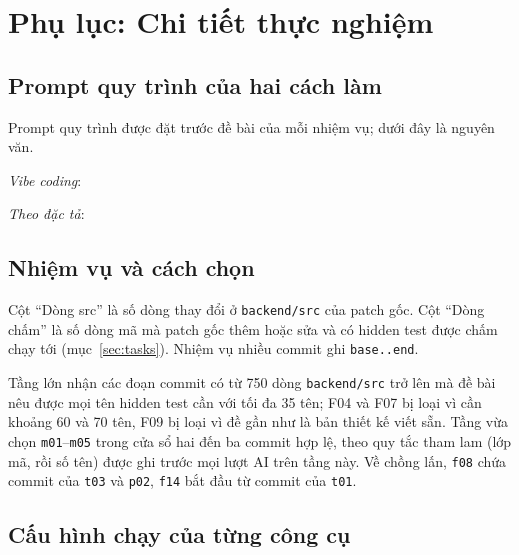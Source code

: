 \section*{Phụ lục: Chi tiết thực nghiệm}\label{app:details}

\subsection{Prompt quy trình của hai cách làm}\label{app:prompts}

Prompt quy trình được đặt trước đề bài của mỗi nhiệm vụ; dưới đây là nguyên văn.

\textit{Vibe coding}:
{\footnotesize{}}

\textit{Theo đặc tả}:
{\footnotesize{}}

\subsection{Nhiệm vụ và cách chọn}\label{app:tasks}

Cột ``Dòng src'' là số dòng thay đổi ở \texttt{backend/src} của patch gốc. Cột ``Dòng chấm'' là số dòng mã
mà patch gốc thêm hoặc sửa và có hidden test được chấm chạy tới (mục~\ref{sec:tasks}). Nhiệm vụ nhiều commit
ghi \texttt{base..end}.

\begin{table}[H]
\centering\small
\caption{Nhiệm vụ của ba tầng và nhiệm vụ thử}\label{tab:tasks}

\end{table}


Tầng lớn nhận các đoạn commit có từ 750 dòng \texttt{backend/src} trở lên mà đề bài nêu được mọi tên
hidden test cần với tối đa 35 tên; F04 và F07 bị loại vì cần khoảng 60 và 70 tên, F09 bị loại vì đề gần như
là bản thiết kế viết sẵn. Tầng vừa chọn \texttt{m01}--\texttt{m05} trong \NumMediumEligible{} cửa sổ hai đến
ba commit hợp lệ, theo quy tắc tham lam (lớp mã, rồi số tên) được ghi trước mọi lượt AI trên tầng này. Về chồng lấn,
\texttt{f08} chứa commit của \texttt{t03} và \texttt{p02}, \texttt{f14} bắt đầu từ commit của \texttt{t01}.

\subsection{Cấu hình chạy của từng công cụ}\label{app:conditions}

